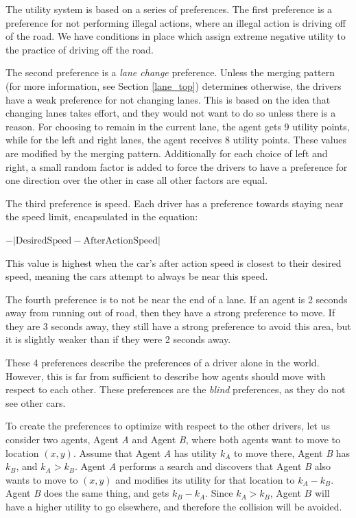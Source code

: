 \documentclass[a4paper, 11pt]{article}
\begin{document}
The utility system is based on a series of preferences. The first preference is a preference for not performing illegal actions, where an illegal action is driving off of the road. We have conditions in place which assign extreme negative utility to the practice of driving off the road. 

The second preference is a \textit{lane change} preference. 
Unless the merging pattern (for more information, see Section \ref{lane_top}) determines otherwise, the drivers have a weak preference for not changing lanes. This is based on the idea that changing lanes takes effort, and they would not want to do so unless there is a reason. For choosing to remain in the current lane, the agent gets 9 utility points, while for the left and right lanes, the agent receives 8 utility points. These values are modified by the merging pattern. Additionally for each choice of left and right, a small random factor is added to force the drivers to have a preference for one direction over the other in case all other factors are equal. 

The third preference is speed. Each driver has a preference towards staying near the speed limit, encapsulated in the equation:

\begin{center}
$-|\mbox{DesiredSpeed} - \mbox{AfterActionSpeed}|$
\end{center}

This value is highest when the car's after action speed is closest to their desired speed, meaning the cars attempt to always be near this speed. 

The fourth preference is to not be near the end of a lane. If an agent is 2 seconds away from running out of road, then they have a strong preference to move. If they are 3 seconds away, they still have a strong preference to avoid this area, but it is slightly weaker than if they were 2 seconds away.

These 4 preferences describe the preferences of a driver alone in the world. However, this is far from sufficient to describe how agents should move with respect to each other. These preferences are the \textit{blind} preferences, as they do not see other cars. 

To create the preferences to optimize with respect to the other drivers, let us consider two agents, Agent \textit{A} and Agent \textit{B}, where both agents want to move to location $(x,y)$. Assume that Agent \textit{A} has utility $k_A$ to move there, Agent \textit{B} has $k_B$, and $k_A > k_B$. Agent \textit{A} performs a search and discovers that Agent \textit{B} also wants to move to $(x,y)$ and modifies its utility for that location to $k_A - k_B$. Agent \textit{B} does the same thing, and gets $k_B - k_A$. Since $k_A > k_B$, Agent $B$ will have a higher utility to go elsewhere, and therefore the collision will be avoided. 
\end{document}
